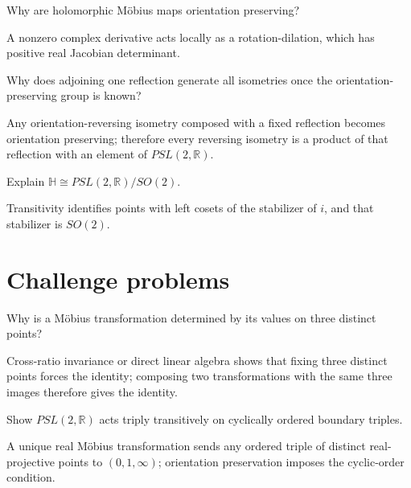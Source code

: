 \begin{problem}\label{prob:vii33-10}
Why are holomorphic Möbius maps orientation preserving?
\end{problem}
\begin{solution}
A nonzero complex derivative acts locally as a rotation-dilation, which has positive real Jacobian determinant.
\end{solution}

\begin{problem}\label{prob:vii33-11}
Why does adjoining one reflection generate all isometries once the orientation-preserving group is known?
\end{problem}
\begin{solution}
Any orientation-reversing isometry composed with a fixed reflection becomes orientation preserving; therefore every reversing isometry is a product of that reflection with an element of \(PSL(2,\mathbb R)\).
\end{solution}

\begin{problem}\label{prob:vii33-12}
Explain \(\mathbb H\cong PSL(2,\mathbb R)/SO(2)\).
\end{problem}
\begin{solution}
Transitivity identifies points with left cosets of the stabilizer of \(i\), and that stabilizer is \(SO(2)\).
\end{solution}

\section{Challenge problems}
\begin{problem}\label{prob:vii33-ch01}
Why is a Möbius transformation determined by its values on three distinct points?
\end{problem}
\begin{solution}
Cross-ratio invariance or direct linear algebra shows that fixing three distinct points forces the identity; composing two transformations with the same three images therefore gives the identity.
\end{solution}

\begin{problem}\label{prob:vii33-ch02}
Show \(PSL(2,\mathbb R)\) acts triply transitively on cyclically ordered boundary triples.
\end{problem}
\begin{solution}
A unique real Möbius transformation sends any ordered triple of distinct real-projective points to \((0,1,\infty)\); orientation preservation imposes the cyclic-order condition.
\end{solution}


